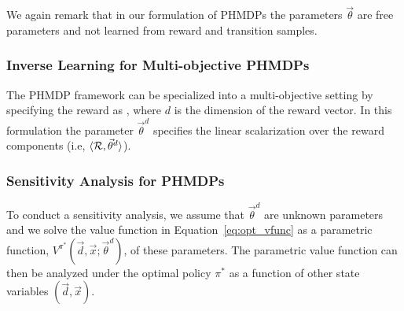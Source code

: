 We again remark that in our formulation of PHMDPs the parameters {\footnotesize $ \vec{\theta} $} are free parameters and not learned from reward and transition samples.


\subsubsection{Inverse Learning for Multi-objective PHMDPs}

The PHMDP framework can be specialized into a multi-objective setting by specifying the reward as {\footnotesize \MORewardFunc}, where {\footnotesize $ d $} is the dimension of the reward vector. In this formulation the parameter {\footnotesize $ \vec{\theta}^{d} $} specifies the linear scalarization over the reward components (i.e, {\footnotesize $\langle \mathcal{R}, \vec{\theta}^{d} \rangle$}).

\subsubsection{Sensitivity Analysis for PHMDPs}

To conduct a sensitivity analysis, we assume that {\footnotesize $\vec{\theta}^{d}$} are unknown parameters and we solve the value function in Equation~\eqref{eq:opt_vfunc} as a parametric function, {\footnotesize $V^{\pi^{*}}(\vec{d}, \vec{x}; \vec{\theta}^{d})$}, of these parameters. The parametric value function can then be analyzed under the optimal policy {\footnotesize $ \pi^{*} $} as a function of other state variables {\footnotesize $(\vec{d}, \vec{x})$}.

